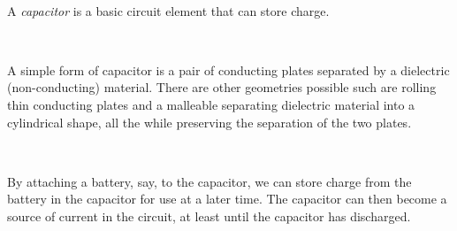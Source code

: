 \documentclass{article}
\begin{document}
\begin{tabular*}{6.5in}{c}
\hline
\end{tabular*}

\


A \textit{capacitor} is a basic circuit element that can store charge. 

\

A simple form of capacitor is a pair of conducting plates separated by a dielectric (non-conducting) material. There are other geometries possible such are rolling thin conducting plates and a malleable separating dielectric material into a cylindrical shape, all the while preserving the separation of the two plates. 

\

By attaching a battery, say, to the capacitor, we can store charge from the battery in the capacitor for use at a later time. The capacitor can then become a source of current in the circuit, at least until the capacitor has discharged.
\end{document}
